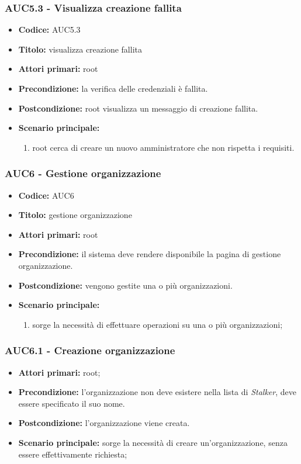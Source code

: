 \documentclass[casi-duso]{subfiles}
\begin{document}
\subsubsection{AUC5.3 - Visualizza creazione fallita}%
\label{subsub:AUC5.3}
\begin{itemize}
  \item \textbf{Codice:} AUC5.3
  \item \textbf{Titolo:} visualizza creazione fallita
  \item \textbf{Attori primari:} root
  \item \textbf{Precondizione:} la verifica delle credenziali è fallita.
  \item \textbf{Postcondizione:} root visualizza un messaggio di creazione fallita.
  \item \textbf{Scenario principale:}
  \begin{enumerate}
    \item root cerca di creare un nuovo amministratore che non rispetta i requisiti.
  \end{enumerate}
\end{itemize}



\subsubsection{AUC6 - Gestione organizzazione}%
\label{subsub:AUC6}
\begin{itemize}
  \item \textbf{Codice:} AUC6
  \item \textbf{Titolo:} gestione organizzazione
  \item \textbf{Attori primari:} root
  \item \textbf{Precondizione:} il sistema deve rendere disponibile la pagina di gestione organizzazione.
  \item \textbf{Postcondizione:} vengono gestite una o più organizzazioni.
  \item \textbf{Scenario principale:}
  \begin{enumerate}
    \item sorge la necessità di effettuare operazioni su una o più organizzazioni;
  \end{enumerate}
\end{itemize}


\subsubsection{AUC6.1 - Creazione organizzazione}%
\label{subsub:AUC6.1}
\begin{itemize}
  \item \textbf{Attori primari:} root;
  \item \textbf{Precondizione:} l'organizzazione non deve esistere nella lista di \emph{Stalker}, deve essere specificato il suo nome.
  \item \textbf{Postcondizione:} l'organizzazione viene creata.
  \item \textbf{Scenario principale:} sorge la necessità di creare un'organizzazione, senza essere effettivamente richiesta;
\end{itemize}
\end{document}

